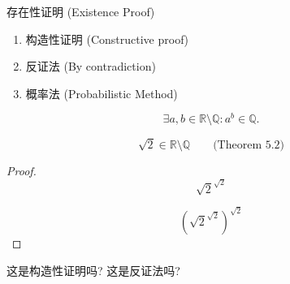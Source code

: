 \begin{frame}{}
  \begin{exampleblock}{存在性证明 (Existence Proof)}
    \begin{enumerate}
      \item 构造性证明 (Constructive proof)
      \item 反证法 (By contradiction)
      \item 概率法 (Probabilistic Method)
    \end{enumerate}
  \end{exampleblock}
\end{frame}

\begin{frame}{}
  \begin{theorem}
    \[
      \exists a, b \in \mathbb{R} \setminus \mathbb{Q}: a^{b} \in \mathbb{Q}.
    \]
  \end{theorem}

  \pause
  \[
    \sqrt{2} \in \mathbb{R} \setminus \mathbb{Q} \qquad \text{(Theorem 5.2)}
  \]

  \pause
  \begin{proof}
    \[
      \sqrt{2}^{\sqrt{2}}
    \]

    \pause
    \[
      (\sqrt{2}^{\sqrt{2}})^{\sqrt{2}}
    \]
  \end{proof}

  \vspace{0.80cm}
  \pause
  \centerline{ 这是构造性证明吗? 这是反证法吗?}
\end{frame}
